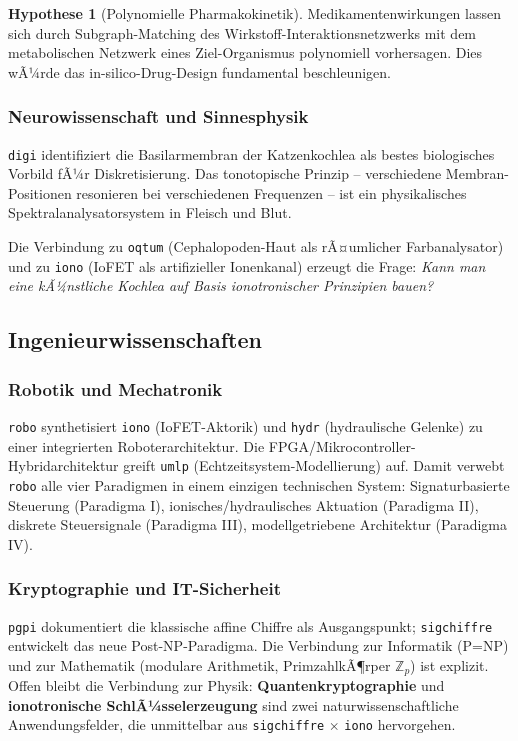 ﻿\documentclass[a4paper,12pt]{scrreprt}
\theoremstyle{definition}
\newtheorem{hypothese}{Hypothese}[section]
\begin{document}
\begin{hypothese}[Polynomielle Pharmakokinetik]
  Medikamentenwirkungen lassen sich durch Subgraph-Matching des
  Wirkstoff-Interaktionsnetzwerks mit dem metabolischen Netzwerk eines
  Ziel-Organismus polynomiell vorhersagen. Dies wÃ¼rde das
  in-silico-Drug-Design fundamental beschleunigen.
\end{hypothese}

\subsubsection{Neurowissenschaft und Sinnesphysik}

\texttt{digi} identifiziert die Basilarmembran der Katzenkochlea als
bestes biologisches Vorbild fÃ¼r Diskretisierung. Das tonotopische Prinzip
-- verschiedene Membran-Positionen resonieren bei verschiedenen Frequenzen --
ist ein physikalisches Spektralanalysatorsystem in Fleisch und Blut.

Die Verbindung zu \texttt{oqtum} (Cephalopoden-Haut als rÃ¤umlicher
Farbana\-lysator) und zu \texttt{iono} (IoFET als artifizieller Ionenkanal)
erzeugt die Frage: \emph{Kann man eine kÃ¼nstliche Kochlea auf Basis
ionotronischer Prinzipien bauen?}

\subsection{Ingenieurwissenschaften}

\subsubsection{Robotik und Mechatronik}

\texttt{robo} synthetisiert \texttt{iono} (IoFET-Aktorik) und
\texttt{hydr} (hydraulische Gelenke) zu einer integrierten Roboterarchitektur.
Die FPGA/Mikrocontroller-Hybridarchitektur greift \texttt{umlp}
(Echtzeitsystem-Modellierung) auf. Damit verwebt \texttt{robo} alle
vier Paradigmen in einem einzigen technischen System:
Signaturbasierte Steuerung (Paradigma I),
ionisches/hydraulisches Aktuation (Paradigma II),
diskrete Steuersignale (Paradigma III),
modellgetriebene Architektur (Paradigma IV).

\subsubsection{Kryptographie und IT-Sicherheit}

\texttt{pgpi} dokumentiert die klassische affine Chiffre als Ausgangspunkt;
\texttt{sigchiffre} entwickelt das neue Post-NP-Paradigma. Die Verbindung
zur Informatik (P=NP) und zur Mathematik (modulare Arithmetik, PrimzahlkÃ¶rper
$\mathbb{Z}_p$) ist explizit. Offen bleibt die Verbindung zur Physik:
\textbf{Quantenkryptographie} und \textbf{ionotronische SchlÃ¼sselerzeugung}
sind zwei naturwissenschaftliche Anwendungsfelder, die unmittelbar aus
\texttt{sigchiffre} $\times$ \texttt{iono} hervorgehen.
\end{document}
